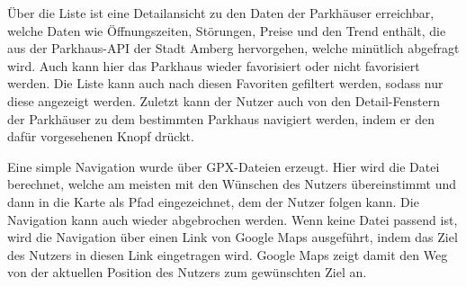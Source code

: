 Über die Liste ist eine Detailansicht zu den Daten der Parkhäuser erreichbar, welche Daten wie Öffnungszeiten, Störungen, Preise und den Trend enthält, die aus der Parkhaus-API der Stadt Amberg hervorgehen, welche minütlich abgefragt wird. Auch kann hier das Parkhaus wieder favorisiert oder nicht favorisiert werden. Die Liste kann auch nach diesen Favoriten gefiltert werden, sodass nur diese angezeigt werden. Zuletzt kann der Nutzer auch von den Detail-Fenstern der Parkhäuser zu dem bestimmten Parkhaus navigiert werden, indem er den dafür vorgesehenen Knopf drückt. 

Eine simple Navigation wurde über GPX-Dateien erzeugt. Hier wird die Datei berechnet, welche am meisten mit den Wünschen des Nutzers übereinstimmt und dann in die Karte als Pfad eingezeichnet, dem der Nutzer folgen kann. Die Navigation kann auch wieder abgebrochen werden. Wenn keine Datei passend ist, wird die Navigation über einen Link von Google Maps ausgeführt, indem das Ziel des Nutzers in diesen Link eingetragen wird. Google Maps zeigt damit den Weg von der aktuellen Position des Nutzers zum gewünschten Ziel an.

